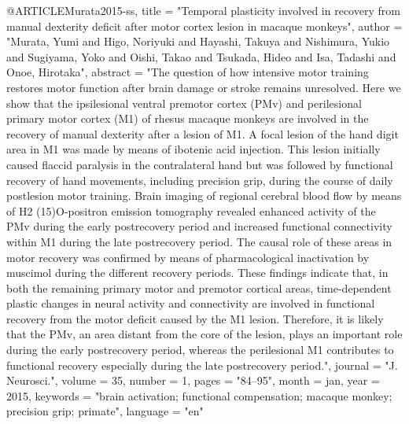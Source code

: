 @ARTICLE{Murata2015-ss,
	title    = "Temporal plasticity involved in recovery from manual dexterity
	deficit after motor cortex lesion in macaque monkeys",
	author   = "Murata, Yumi and Higo, Noriyuki and Hayashi, Takuya and
	Nishimura, Yukio and Sugiyama, Yoko and Oishi, Takao and Tsukada,
	Hideo and Isa, Tadashi and Onoe, Hirotaka",
	abstract = "The question of how intensive motor training restores motor
	function after brain damage or stroke remains unresolved. Here we
	show that the ipsilesional ventral premotor cortex (PMv) and
	perilesional primary motor cortex (M1) of rhesus macaque monkeys
	are involved in the recovery of manual dexterity after a lesion
	of M1. A focal lesion of the hand digit area in M1 was made by
	means of ibotenic acid injection. This lesion initially caused
	flaccid paralysis in the contralateral hand but was followed by
	functional recovery of hand movements, including precision grip,
	during the course of daily postlesion motor training. Brain
	imaging of regional cerebral blood flow by means of H2
	(15)O-positron emission tomography revealed enhanced activity of
	the PMv during the early postrecovery period and increased
	functional connectivity within M1 during the late postrecovery
	period. The causal role of these areas in motor recovery was
	confirmed by means of pharmacological inactivation by muscimol
	during the different recovery periods. These findings indicate
	that, in both the remaining primary motor and premotor cortical
	areas, time-dependent plastic changes in neural activity and
	connectivity are involved in functional recovery from the motor
	deficit caused by the M1 lesion. Therefore, it is likely that the
	PMv, an area distant from the core of the lesion, plays an
	important role during the early postrecovery period, whereas the
	perilesional M1 contributes to functional recovery especially
	during the late postrecovery period.",
	journal  = "J. Neurosci.",
	volume   =  35,
	number   =  1,
	pages    = "84--95",
	month    =  jan,
	year     =  2015,
	keywords = "brain activation; functional compensation; macaque monkey;
	precision grip; primate",
	language = "en"
}


